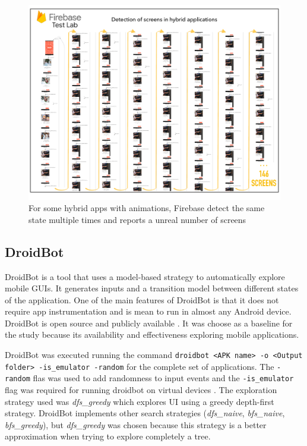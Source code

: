 \begin{figure}[t]
	\centering
	\includegraphics[width=1\textwidth]{img/multipleScreens.pdf}
	\vspace{-0.8cm}
	\caption{For some hybrid apps with animations, Firebase detect the same state multiple times and reports a unreal number of screens}
	
	\label{multipleScreens}
\end{figure} 



\subsection{DroidBot}

DroidBot \cite{Li:ICSE17} is a tool that uses a model-based strategy to automatically explore mobile GUIs. It generates inputs and a transition model between different states of the application. One of the main features of DroidBot is that it does not require app instrumentation and is mean to run in almost any Android device. DroidBot is open source and publicly available \cite{droidbotRepo}.
It was choose as a baseline for the study because its availability and effectiveness exploring mobile applications.

DroidBot was executed running the command \texttt{droidbot <APK name> -o <Output folder> -is\_emulator -random} for the complete set of applications. The \texttt{-random}  flas was used to add randomness to input events and the \texttt{-is\_emulator}  flag was required for running droidbot on virtual devices . The exploration strategy used was \textit{dfs\_greedy} which explores UI using a greedy depth-first strategy. DroidBot implements other search strategies (\eg \textit{dfs\_naive}, \textit{bfs\_naive}, \textit{bfs\_greedy}), but  \textit{dfs\_greedy} was chosen because this strategy is a better approximation when trying to explore completely a tree.

